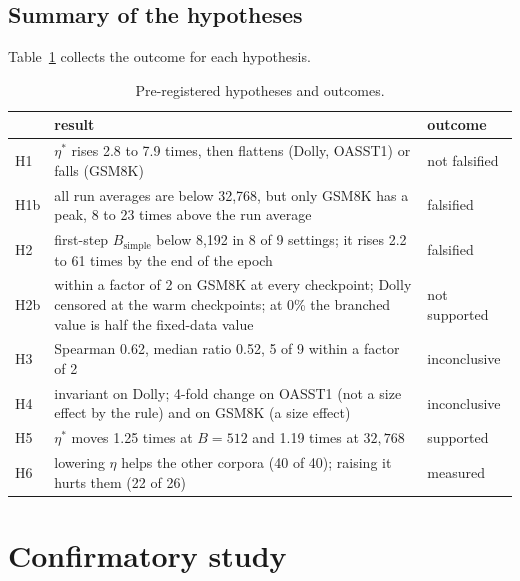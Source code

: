 \documentclass[10pt]{article}
\newcommand{\bsimple}{B_{\mathrm{simple}}}
\begin{document}
\subsection{Summary of the hypotheses}

Table~\ref{tab:verdicts} collects the outcome for each hypothesis.

\begin{table}[t]
\centering
\caption{Pre-registered hypotheses and outcomes.}
\label{tab:verdicts}
\small
\begin{tabular}{lp{}l}
\toprule
 & result & outcome \\
\midrule
H1 & $\eta^*$ rises 2.8 to 7.9 times, then flattens (Dolly, OASST1) or falls (GSM8K) & not falsified \\
H1b & all run averages are below 32,768, but only GSM8K has a peak, 8 to 23 times above the run average & falsified \\
H2 & first-step $\bsimple$ below 8,192 in 8 of 9 settings; it rises 2.2 to 61 times by the end of the epoch & falsified \\
H2b & within a factor of 2 on GSM8K at every checkpoint; Dolly censored at the warm checkpoints; at 0\% the branched value is half the fixed-data value & not supported \\
H3 & Spearman 0.62, median ratio 0.52, 5 of 9 within a factor of 2 & inconclusive \\
H4 & invariant on Dolly; 4-fold change on OASST1 (not a size effect by the rule) and on GSM8K (a size effect) & inconclusive \\
H5 & $\eta^*$ moves 1.25 times at $B=512$ and 1.19 times at $32{,}768$ & supported \\
H6 & lowering $\eta$ helps the other corpora (40 of 40); raising it hurts them (22 of 26) & measured \\
\bottomrule
\end{tabular}
\end{table}

\section{Confirmatory study}\label{sec:confirm}
\end{document}
